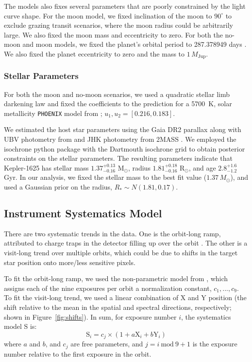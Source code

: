 \documentclass[twocolumn]{aastex62}
\newcommand{\Mod}[1]{\ \mathrm{mod}\ #1}
\begin{document}
The models also fixes several parameters that are poorly constrained by the light curve shape. For the moon model, we fixed inclination of the moon to $90^\circ$ to exclude grazing transit scenarios, where the moon radius could be arbitrarily large.  We also fixed the moon mass and eccentricity to zero.  For both the no-moon and moon models, we fixed the planet's orbital period to 287.378949 days \citep{teachey18b}. We also fixed the planet eccentricity to zero and the mass to $1\,M_\mathrm{Jup}$. 


\subsubsection{Stellar Parameters}
For both the moon and no-moon scenarios, we used a quadratic stellar limb darkening law and fixed the coefficients to the prediction for a 5700~K, solar metallicity \texttt{PHOENIX} model from \cite{espinoza15}; $u_1, u_2 = [0.216, 0.183]$.  

We estimated the host star parameters using the Gaia DR2 parallax \citep{Gaia, GaiaDR2} along with UBV photometry from \citet{Everett2012} and JHK photometry from 2MASS \citep{2MASS}. We employed the isochrone python package \citep{isochrone} with the Dartmouth isochrone grid \citep{Dotter2008} to obtain posterior constraints on the stellar parameters. The resulting parameters indicate that Kepler-1625 has stellar mass $1.37^{+0.13}_{-0.16}$ M$_{\odot}$, radius $1.81^{+0.18}_{-0.16}$ R$_{\odot}$, and age $2.8^{+1.6}_{-1.2}$ Gyr. In our analysis, we fixed the stellar mass to the best fit value ($1.37\,M_\odot$), and used a Gaussian prior on the radius, $R_* \sim N(1.81, 0.17)$.


\subsection{Instrument Systematics Model}
There are two systematic trends in the data. One is the orbit-long ramp, attributed to charge traps in the detector filling up over the orbit \citep{zhou17}. The other is a visit-long trend over multiple orbits, which could be due to shifts in the target star position onto more/less sensitive pixels.

To fit the orbit-long ramp, we used the non-parametric model from \cite{teachey18b}, which assigns each of the nine exposures per orbit a normalization constant, $c_1, ..., c_9$. To fit the visit-long trend, we used a linear combination of X and Y position (the shift relative to the mean in the spatial and spectral directions, respectively; shown in Figure~\ref{fig:shifts}).  In sum, for exposure number $i$, the systematics model S is:
\begin{equation}
\label{eq:sys}
    \mathrm{S}_i = c_{j}\times(1 + a\mathrm{X}_i + b\mathrm{Y}_i) 
\end{equation}
where $a$ and $b$, and $c_j$ are free parameters, and $j = i\Mod9 + 1$ is the exposure number relative to the first exposure in the orbit.
\end{document}
